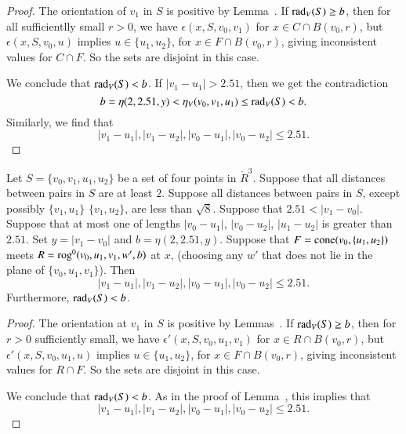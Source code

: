 \begin{proof}  
The orientation
of $v_1$ in $S$ is positive by Lemma~.
 If $\operatorname{rad}_V(S)\ge b$, then for all sufficientlly small $r>0$, we have
$\epsilon(x,S,v_0,v_1)$ for $x\in C\cap B(v_0,r)$, 
but $\epsilon(x,S,v_0,u)$ implies $u\in\{u_1,u_2\}$,
for $x\in F\cap B(v_0,r)$, giving inconsistent values for $C\cap F$.  So
the sets are disjoint in this case.  

We conclude that $\operatorname{rad}_V(S) < b$.
If $|v_1-u_1| > 2.51$, then we get the contradiction
$$b = \eta(2,2.51,y) < \eta_V(v_0,v_1,u_1)\le \operatorname{rad}_V(S) < b.$$
Similarly, we find that
   $$
   |v_1-u_1|,|v_1-u_2|,|v_0-u_1|,|v_0-u_2| \le 2.51.
   $$
\end{proof}

\newpage

\begin{lemma}
 Let $S=\{v_0,v_1,u_1,u_2\}$ be a set of four points
in $\ring{R}^3$.
Suppose that all distances between pairs in $S$ are at least $2$.
Suppose all distances between pairs in $S$, except possibly $\{v_1,u_1\}$
$\{v_1,u_2\}$, are
less than $\sqrt8$.
Suppose that $2.51 < |v_1-v_0|$.
Suppose that at most one of lengths $|v_0-u_1|$,
$|v_0-u_2|$, $|u_1-u_2|$ is greater than $2.51$.
%
Set $y=|v_1-v_0|$ and $b=\eta(2,2.51,y)$.
Suppose that $F={\operatorname{cone}}(v_0,\{u_1,u_2\})$ meets
$R={\operatorname{rog}}^0(v_0,u_1,v_1,w',b)$ at $x$, (choosing any $w'$ that
does not lie in the plane of $\{v_0,u_1,v_1\}$).
Then 
  $$
  |v_1-u_1|,|v_1-u_2|,|v_0-u_1|,|v_0-u_2|\le 2.51.
  $$
Furthermore, $\operatorname{rad}_V(S) < b$. 
\end{lemma}

\begin{proof}  
The orientation
at $v_1$ in $S$ is positive by Lemmas~.
If $\operatorname{rad}_V(S)\ge b$, then for $r>0$ sufficiently small, we have
$\epsilon'(x,S,v_0,u_1,v_1)$ for $x\in R\cap B(v_0,r)$, 
but $\epsilon'(x,S,v_0,u_1,u)$ implies $u\in\{u_1,u_2\}$,
for $x\in F\cap B(v_0,r)$, giving inconsistent values for $R\cap F$.  So
the sets are disjoint in this case.  

We conclude that $\operatorname{rad}_V(S) < b$.
As in the proof of Lemma~,
this implies that
   $$
   |v_1-u_1|,|v_1-u_2|,|v_0-u_1|,|v_0-u_2| \le 2.51.
   $$
\end{proof}

